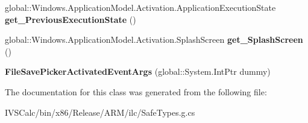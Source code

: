 \begin{DoxyCompactItemize}
global\+::\+Windows.\+Application\+Model.\+Activation.\+Application\+Execution\+State {\bfseries get\+\_\+\+Previous\+Execution\+State} ()
\item 
\mbox{\label{class_windows_1_1_application_model_1_1_activation_1_1_file_save_picker_activated_event_args_a267e1f73d5ddd40ddfecc19ef78e13a0}} 
global\+::\+Windows.\+Application\+Model.\+Activation.\+Splash\+Screen {\bfseries get\+\_\+\+Splash\+Screen} ()
\item 
\mbox{\label{class_windows_1_1_application_model_1_1_activation_1_1_file_save_picker_activated_event_args_ae899934ca1652ab5d6dfd11011243dcf}} 
{\bfseries File\+Save\+Picker\+Activated\+Event\+Args} (global\+::\+System.\+Int\+Ptr dummy)
\end{DoxyCompactItemize}


The documentation for this class was generated from the following file\+:\begin{DoxyCompactItemize}
\item 
I\+V\+S\+Calc/bin/x86/\+Release/\+A\+R\+M/ilc/Safe\+Types.\+g.\+cs\end{DoxyCompactItemize}

